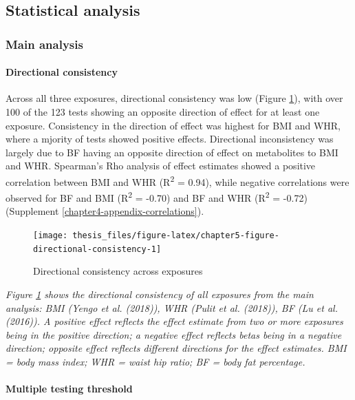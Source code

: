 \documentclass[11pt,twoside]{bristolthesis}
\newcommand{\bsmall}{\begin{small}}
\newcommand{\esmall}{\end{small}}
\begin{document}
\hypertarget{statistical-analysis-1}{%
\subsection{Statistical analysis}\label{statistical-analysis-1}}

\hypertarget{main-analysis-1}{%
\subsubsection{Main analysis}\label{main-analysis-1}}

\hypertarget{directional-consistency}{%
\paragraph{Directional consistency}\label{directional-consistency}}

Across all three exposures, directional consistency was low (Figure \ref{fig:chapter5-figure-directional-consistency}), with over 100 of the 123 tests showing an opposite direction of effect for at least one exposure. Consistency in the direction of effect was highest for BMI and WHR, where a mjority of tests showed positive effects. Directional inconsistency was largely due to BF having an opposite direction of effect on metabolites to BMI and WHR. Spearman's Rho analysis of effect estimates showed a positive correlation between BMI and WHR (R\textsuperscript{2} = 0.94), while negative correlations were observed for BF and BMI (R\textsuperscript{2} = -0.70) and BF and WHR (R\textsuperscript{2} = -0.72) (Supplement \ref{chapter4-appendix-correlations}).
\begin{figure}
\texttt{[image: thesis\_files/figure-latex/chapter5-figure-directional-consistency-1]} \caption{Directional consistency across exposures}\label{fig:chapter5-figure-directional-consistency}
\end{figure}
\noindent 
\bsmall
\emph{Figure \ref{fig:chapter5-figure-directional-consistency} shows the directional consistency of all exposures from the main analysis: BMI (Yengo et al. (2018)), WHR (Pulit et al. (2018)), BF (Lu et al. (2016)). A positive effect reflects the effect estimate from two or more exposures being in the positive direction; a negative effect reflects betas being in a negative direction; opposite effect reflects different directions for the effect estimates. BMI = body mass index; WHR = waist hip ratio; BF = body fat percentage.}
\esmall

\hypertarget{multiple-testing-threshold}{%
\paragraph{Multiple testing threshold}\label{multiple-testing-threshold}}
\end{document}
